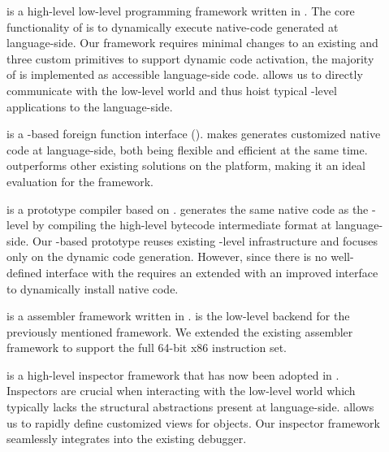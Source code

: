 \begin{description}
	\item[\B] is a high-level low-level programming framework written in .
	The core functionality of \B is to dynamically execute native-code generated at language-side.
	Our framework requires minimal changes to an existing \VM and three custom primitives to support dynamic code activation, the majority of \B is implemented as accessible language-side code.
	\B allows us to directly communicate with the low-level world and thus hoist typical \VM-level applications to the language-side.
		
	\item[\NB] is a \B-based foreign function interface (\FFI).
	\NB makes generates customized native code at language-side, both being flexible and efficient at the same time.
	\NB outperforms other existing \FFI solutions on the \PH platform, making it an ideal evaluation for the \B framework.
	
	\item[\NBJ] is a prototype \JIT compiler based on \B.
	\NBJ generates the same native code as the \VM-level \JIT by compiling the high-level bytecode intermediate format at language-side.
	Our \B-based \JIT prototype reuses existing \VM-level infrastructure and focuses only on the dynamic code generation.
	However, since there is no well-defined interface with the \VM \NBJ requires an extended \VM with an improved \JIT interface to dynamically install native code.
	
	\item[\AsmJIT] is a assembler framework written in \PH.
	\AsmJIT is the low-level backend for the previously mentioned \B framework.
	We extended the existing assembler framework to support the full 64-bit x86 instruction set.
	
	\item[\Eye] is a high-level inspector framework that has now been adopted in \PH.
	Inspectors are crucial when interacting with the low-level world which typically lacks the structural abstractions present at language-side.
	\Eye allows us to rapidly define customized views for \PH objects.
	Our inspector framework seamlessly integrates into the existing \PH debugger.
		
\end{description}


